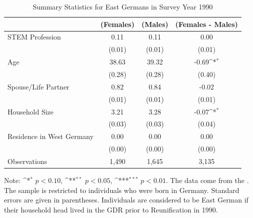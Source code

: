 \documentclass[a4paper, oneside, hyperfootnotes = false]{article}
\def\sym#1{\ifmmode^{#1}\else\(^{#1}\)\fi}
\begin{document}
{\begin{table}[ht]
	\caption{Summary Statistics for East Germans in Survey Year 1990}
	\label{tab:descr_summary_east}
	\begin{center}
		\begin{tabular}{l*{3}{c}}
			\toprule
			& (Females) & (Males) & (Females - Males) \\
			\midrule
			STEM Profession & 0.11  & 0.11  &   0.00     \\
			&   (0.01)  & (0.01) & (0.01) \\
			\addlinespace
			Age         &   38.63   &  39.32  &  -0.69\sym{*}     \\
			&     (0.28) &        (0.28)         &      (0.40) \\
			\addlinespace
			Spouse/Life Partner &  0.82      &  0.84  &    -0.02    \\
			&      (0.01)&          (0.01)&         (0.01) \\
			\addlinespace
			Household Size      &  3.21   &  3.28   &   -0.07\sym{*}       \\
			&          (0.03)&       (0.03)        &      (0.04)\\
			\addlinespace
			Residence in West Germany&  0.00   &   0.00  &  0.00         \\
			&         (0.00) &       (0.00)&  (0.00)\\
			\midrule
			Observations        &  1,490    &    1,645     &      3,135             \\
			\bottomrule
		\end{tabular}
		
		\vspace{2mm}
		
		\parbox{10cm}{
			\linespread{1}\footnotesize Note: \sym{*} \(p<0.10\), \sym{**} \(p<0.05\), \sym{***} \(p<0.01\). The data come from the \cite{SOEP2023}. The sample is restricted to individuals who were born in Germany. Standard errors are given in parentheses. Individuals are considered to be East German if their household head lived in the GDR prior to Reunification in 1990.}
		
	\end{center}
\end{table}

}
\end{document}
